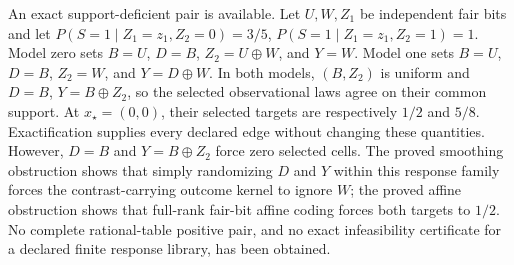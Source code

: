 An exact support-deficient pair is available. Let \(U,W,Z_1\) be independent fair bits and let \(P(S=1\mid Z_1=z_1,Z_2=0)=3/5\), \(P(S=1\mid Z_1=z_1,Z_2=1)=1\). Model zero sets \(B=U\), \(D=B\), \(Z_2=U\oplus W\), and \(Y=W\). Model one sets \(B=U\), \(D=B\), \(Z_2=W\), and \(Y=D\oplus W\). In both models, \((B,Z_2)\) is uniform and \(D=B\), \(Y=B\oplus Z_2\), so the selected observational laws agree on their common support. At \(x_\star=(0,0)\), their selected targets are respectively \(1/2\) and \(5/8\). Exactification supplies every declared edge without changing these quantities. However, \(D=B\) and \(Y=B\oplus Z_2\) force zero selected cells. The proved smoothing obstruction shows that simply randomizing \(D\) and \(Y\) within this response family forces the contrast-carrying outcome kernel to ignore \(W\); the proved affine obstruction shows that full-rank fair-bit affine coding forces both targets to \(1/2\). No complete rational-table positive pair, and no exact infeasibility certificate for a declared finite response library, has been obtained.